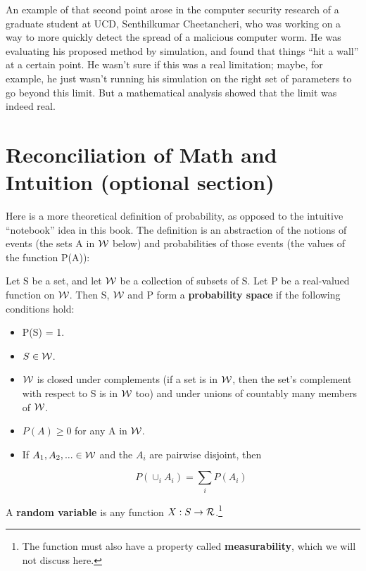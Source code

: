 An example of that second point arose in the computer security research
of a graduate student at UCD, Senthilkumar Cheetancheri, who was working
on a way to more quickly detect the spread of a malicious computer worm.
He was evaluating his proposed method by simulation, and found that
things ``hit a wall'' at a certain point.  He wasn't sure if this was a
real limitation; maybe, for example, he just wasn't running his
simulation on the right set of parameters to go beyond this limit.  But
a mathematical analysis showed that the limit was indeed real.

\section{Reconciliation of Math and Intuition (optional section)} 
\label{reconcil}

Here is a more theoretical definition of probability, as opposed to the
intuitive ``notebook'' idea in this book.  The definition is an
abstraction of the notions of events (the sets A in $\cal W$ below) and
probabilities of those events (the values of the function P(A)):

\begin{definition}
Let S be a set, and let $\cal W$ be a collection of
subsets of S.  Let P be a real-valued function on $\cal W$.  Then S,
$\cal W$ and P form a {\bf probability space} if the following
conditions hold:

\begin{itemize}

\item P(S) = 1.

\item $S \in \cal W$.

\item $\cal W$ is closed under complements (if a set is in $\cal W$,
then the set's complement with respect to S is in $\cal W$ too) and
under unions of countably many members of $\cal W$.

\item $P(A) \geq 0$ for any A in $\cal W$.

\item If $A_1, A_2,... \in \cal W$ and the $A_i$ are pairwise disjoint,
then

\begin{equation}
P(\cup_i A_i) = \sum_i P(A_i)
\end{equation}

\end{itemize}

A {\bf random variable} is any function $X: S \rightarrow \cal
R$.\footnote{The function must also have a property called {\bf
measurability}, which we will not discuss here.}

\end{definition}

